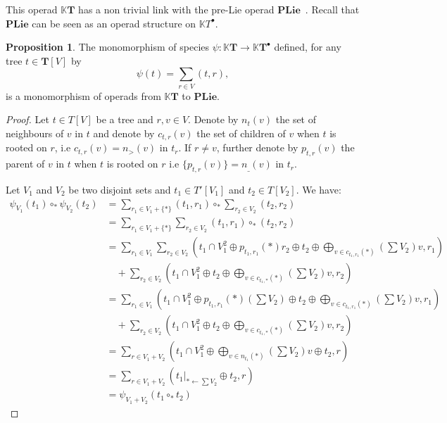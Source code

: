 \documentclass[a4paper]{article}
\theoremstyle{definition}
\newtheorem{proposition}[definition]{Proposition}
\newcommand{\K}{\mathbb{K}}
\newcommand{\PLie}{\mathbf{PLie}}
\newcommand{\T}{\mathbf{T}}
\begin{document}
This operad $\K \T$ has a non trivial link with the pre-Lie operad $\PLie$~\cite{CL01}.
Recall that $\PLie$ can be seen as an operad structure on $\K T^{\bullet}$.
\begin{proposition} \label{prelie}
	The monomorphism of species $\psi : \K \T \to \K \T^{\bullet}$ defined, for any tree
	$t \in \T[V]$ by
	\begin{equation}
	    \psi(t) =  \sum_{r \in V} (t, r),
	\end{equation}
	is a monomorphism of operads from $\K \T$ to $\PLie$.
\end{proposition}

\begin{proof}
Let $t\in T[V]$ be a tree and $r,v\in V$. Denote by $n_t(v)$ the set of neighbours of 
$v$ in $t$ and denote by $c_{t,r}(v)$ the set of children of $v$ when $t$ is rooted 
on $r$, i.e $c_{t,r}(v)= n_{>}(v)$ in $t_r$. If $r\not = v$, further denote by 
$p_{t,r}(v)$ the parent of $v$ in $t$ when $t$ is rooted on $r$ i.e 
$\{p_{t,r}(v)\} = n_{\_}(v)$ in $t_r$.

Let $V_1$ and $V_2$ be two disjoint sets and $t_1\in T'[V_1]$ and $t_2\in T[V_2]$. We have:
\begin{equation}\begin{split}
	\psi_{V_1}(t_1)\circ_{\ast} \psi_{V_2}(t_2) 
	&= \sum_{r_1\in V_1+\{\ast\}} (t_1,r_1) \circ_{\ast} \sum_{r_2\in V_2}(t_2,r_2) \\
	&= \sum_{r_1\in V_1+\{\ast\}}\sum_{r_2\in V_2} (t_1,r_1)\circ_{\ast} (t_2,r_2) \\ 
	&= \sum_{r_1\in V_1}\sum_{r_2\in V_2} \left(t_1\cap V_1^2\oplus p_{t_1,r_1}(\ast)r_2
	\oplus t_2 \oplus \bigoplus_{v\in c_{t_1,r_1}(\ast)} \left(\sum V_2\right)v, r_1\right) \\
	&\quad + \sum_{r_2\in V_2}\left(t_1\cap V_1^2\oplus t_2 \oplus \bigoplus_{v\in c_{t_1,\ast}(\ast)} 
	\left(\sum V_2\right)v,r_2\right) \\
	&= \sum_{r_1\in V_1} \left(t_1\cap V_1^2\oplus p_{t_1,r_1}(\ast)\left(\sum V_2\right) 
	\oplus t_2 \oplus \bigoplus_{v\in c_{t_1,r_1}(\ast)} \left(\sum V_2\right)v, r_1\right) \\
	&\quad+ \sum_{r_2\in V_2} \left(t_1\cap V_1^2\oplus t_2 \oplus \bigoplus_{v\in c_{t_1,\ast}(\ast)} 
	\left(\sum V_2\right)v,r_2\right) \\
	&= \sum_{r\in V_1+V_2}\left(t_1\cap V_1^2\oplus\bigoplus_{v\in n_{t_1}(\ast)}\left(\sum V_2\right)v
	\oplus t_2,r\right) \\
	&= \sum_{r\in V_1+V_2} \left(t_1|_{\ast \leftarrow \sum V_2}\oplus t_2,r\right) \\
	&= \psi_{V_1+V_2}(t_1\circ_{\ast} t_2)
\end{split}\end{equation}
\end{proof}
\end{document}
